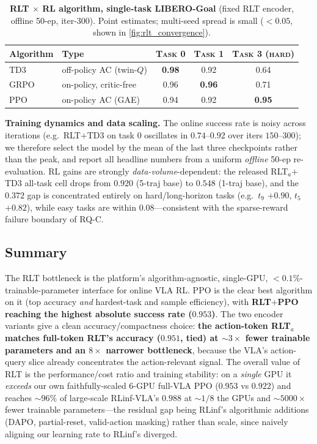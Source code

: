 \begin{table}[t]
    \centering
    \caption{\textbf{RLT $\times$ RL algorithm, single-task LIBERO-Goal} (fixed RLT encoder, offline 50-ep, iter-300). Point estimates; multi-seed spread is small ($<0.05$, shown in \cref{fig:rlt_convergence}).}
    \label{tab:rlt_algo}
    \vspace{0.3em}
    \footnotesize
    \setlength{\tabcolsep}{8pt}
    \renewcommand{\arraystretch}{1.15}
    \begin{tabular}{@{}l l ccc@{}}
        \toprule
        \textbf{Algorithm} & \textbf{Type} & \textsc{Task 0} & \textsc{Task 1} & \textsc{Task 3 (hard)} \\
        \midrule
        TD3  & off-policy AC (twin-$Q$)      & \textbf{0.98} & 0.92 & 0.64 \\
        GRPO & on-policy, critic-free        & 0.96 & \textbf{0.96} & 0.71 \\
        PPO  & on-policy AC (GAE)            & 0.94 & 0.92 & \textbf{0.95} \\
        \bottomrule
    \end{tabular}
\end{table}

\textbf{Training dynamics and data scaling.} The online success rate is noisy across iterations (e.g.\ RLT$+$TD3 on task $0$ oscillates in $0.74$--$0.92$ over iters $150$--$300$); we therefore select the model by the mean of the last three checkpoints rather than the peak, and report all headline numbers from a uniform \emph{offline} 50-ep re-evaluation. RL gains are strongly \emph{data-volume}-dependent: the released RLT$_a$$+$TD3 all-task cell drops from $0.920$ (5-traj base) to $0.548$ (1-traj base), and the $0.372$ gap is concentrated entirely on hard/long-horizon tasks (e.g.\ $t_9$ $+0.90$, $t_5$ $+0.82$), while easy tasks are within $0.08$---consistent with the sparse-reward failure boundary of RQ-C.

\subsection{Summary}
The RLT bottleneck is the platform's algorithm-agnostic, single-GPU, $<0.1\%$-trainable-parameter interface for online VLA RL. PPO is the clear best algorithm on it (top accuracy \emph{and} hardest-task and sample efficiency), with \textbf{RLT$+$PPO reaching the highest absolute success rate ($0.953$)}. The two encoder variants give a clean accuracy/compactness choice: \textbf{the action-token RLT$_a$ matches full-token RLT's accuracy ($0.951$, tied) at ${\sim}3\times$ fewer trainable parameters and an $8\times$ narrower bottleneck}, because the VLA's action-query slice already concentrates the action-relevant signal. The overall value of RLT is the performance/cost ratio and training stability: on a \emph{single} GPU it \emph{exceeds} our own faithfully-scaled $6$-GPU full-VLA PPO ($0.953$ vs $0.922$) and reaches ${\sim}96\%$ of large-scale RLinf-VLA's $0.988$ at ${\sim}1/8$ the GPUs and ${\sim}5000\times$ fewer trainable parameters---the residual gap being RLinf's algorithmic additions (DAPO, partial-reset, valid-action masking) rather than scale, since naively aligning our learning rate to RLinf's diverged.
